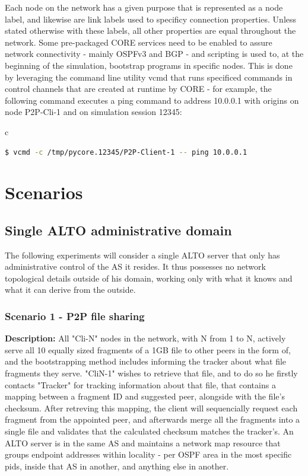     Each node on the network has a given purpose that is represented as a node label, and likewise are link labels used to specificy connection properties.
    Unless stated otherwise with these labels, all other properties are equal throughout the network.
    Some pre-packaged CORE services need to be enabled to assure network connectivity - mainly OSPFv3 and BGP - and scripting is used to, at the beginning of the simulation, bootstrap programs in specific nodes.
    This is done by leveraging the command line utility vcmd that runs specificed commands in control channels that are created at runtime by CORE - for example, the following command executes a ping command to address 10.0.0.1 with origins on node P2P-Cli-1 and on simulation session 12345:

    \begin{center}
    \begin{tabular}{c}
    \begin{lstlisting}[caption=Execution of an example command through the control channel of a given node, language=bash]
        $ vcmd -c /tmp/pycore.12345/P2P-Client-1 -- ping 10.0.0.1
    \end{lstlisting}
    \end{tabular}
    \end{center}

\section{Scenarios}

\subsection{Single ALTO administrative domain}

    The following experiments will consider a single ALTO server that only has administrative control of the AS it resides.
    It thus possesses no network topological details outside of his domain, working only with what it knows and what it can derive from the outside.

\subsubsection{Scenario 1 - P2P file sharing}
\textbf{Description:} All "Cli-N" nodes in the network, with N from 1 to N, actively serve all 10 equally sized fragments of a 1GB file to other peers in the form of, and the bootstrapping method includes informing the tracker about what file fragments they serve.
    "CliN-1" wishes to retrieve that file, and to do so he firstly contacts "Tracker" for tracking information about that file, that contains a mapping between a fragment ID and suggested peer, alongside with the file's checksum.
    After retreving this mapping, the client will sequencially request each fragment from the appointed peer, and afterwards merge all the fragments into a single file and validates that the calculated checksum matches the tracker's.
    An ALTO server is in the same AS and maintains a network map resource that groups endpoint addresses within locality - per OSPF area in the most specific pids, inside that AS in another, and anything else in another.


